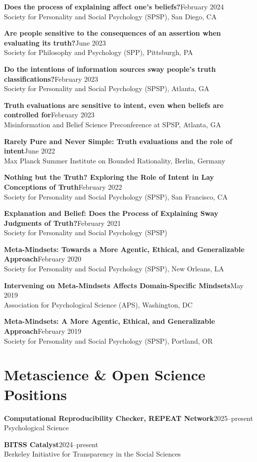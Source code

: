\documentclass[11pt, letterpaper]{article}
\newcommand{\cventry}[3]{%
    \textbf{#1}\hfill #2\\
    {\color{mutedgray}#3}\par\vspace{0.3em}%
}
\begin{document}
\cventry{Does the process of explaining affect one's beliefs?}{February 2024}
    {Society for Personality and Social Psychology (SPSP), San Diego, CA}

\cventry{Are people sensitive to the consequences of an assertion when evaluating its truth?}{June 2023}
    {Society for Philosophy and Psychology (SPP), Pittsburgh, PA}

\cventry{Do the intentions of information sources sway people's truth classifications?}{February 2023}
    {Society for Personality and Social Psychology (SPSP), Atlanta, GA}

\cventry{Truth evaluations are sensitive to intent, even when beliefs are controlled for}{February 2023}
    {Misinformation and Belief Science Preconference at SPSP, Atlanta, GA}

\cventry{Rarely Pure and Never Simple: Truth evaluations and the role of intent}{June 2022}
    {Max Planck Summer Institute on Bounded Rationality, Berlin, Germany}

\cventry{Nothing but the Truth? Exploring the Role of Intent in Lay Conceptions of Truth}{February 2022}
    {Society for Personality and Social Psychology (SPSP), San Francisco, CA}

\cventry{Explanation and Belief: Does the Process of Explaining Sway Judgments of Truth?}{February 2021}
    {Society for Personality and Social Psychology (SPSP)}

\cventry{Meta-Mindsets: Towards a More Agentic, Ethical, and Generalizable Approach}{February 2020}
    {Society for Personality and Social Psychology (SPSP), New Orleans, LA}

\cventry{Intervening on Meta-Mindsets Affects Domain-Specific Mindsets}{May 2019}
    {Association for Psychological Science (APS), Washington, DC}

\cventry{Meta-Mindsets: A More Agentic, Ethical, and Generalizable Approach}{February 2019}
    {Society for Personality and Social Psychology (SPSP), Portland, OR}

\section{Metascience \& Open Science Positions}

\cventry{Computational Reproducibility Checker, REPEAT Network}{2025--present}
    {Psychological Science}

\cventry{BITSS Catalyst}{2024--present}
    {Berkeley Initiative for Transparency in the Social Sciences}
\end{document}
